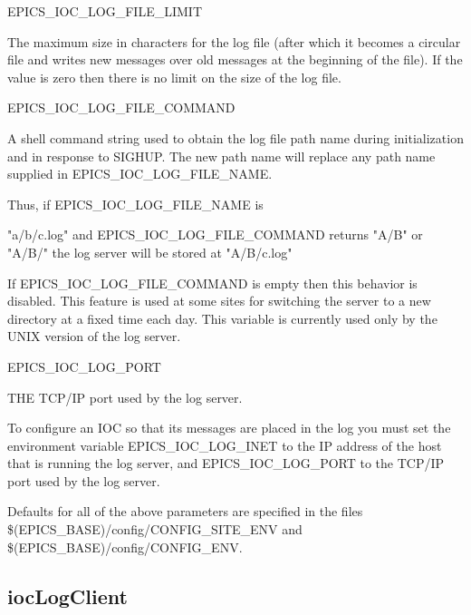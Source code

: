 \begin{description}\item {}EPICS\_IOC\_LOG\_FILE\_LIMIT

\end{description}The maximum size in characters for the log file (after which it becomes a circular file and writes new 
messages over old  messages at the beginning of the file). If the value is zero then there is no limit on the 
size of the log file. 

\begin{description}\item {}EPICS\_IOC\_LOG\_FILE\_COMMAND

\end{description}A shell command string used to obtain the log file path name during initialization and in response to 
SIGHUP. The new path name will replace any path name supplied in EPICS\_IOC\_LOG\_FILE\_NAME.

Thus, if EPICS\_IOC\_LOG\_FILE\_NAME is 

"a/b/c.log" and EPICS\_IOC\_LOG\_FILE\_COMMAND returns "A/B" or "A/B/" the log server will be stored 
at "A/B/c.log"

If EPICS\_IOC\_LOG\_FILE\_COMMAND is empty then this behavior is disabled. This feature is used at 
some sites for switching the server to a new directory at a fixed time each day. This variable is currently 
used only by the UNIX version of the log server.

\begin{description}\item {}EPICS\_IOC\_LOG\_PORT

\end{description}THE TCP/IP port used by the log server.

To configure an IOC so that its messages are placed in the log you must set the environment variable 
EPICS\_IOC\_LOG\_INET to the IP address of the host that is running the log server, and EPICS\_IOC\_LOG\_PORT to the 
TCP/IP port used by the log server.

Defaults for all of the above parameters are specified in  the files \$(EPICS\_BASE)/config/CONFIG\_SITE\_ENV and 
\$(EPICS\_BASE)/config/CONFIG\_ENV.

\subsection{iocLogClient}

